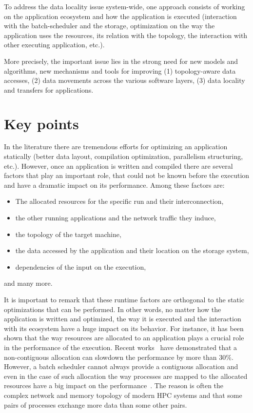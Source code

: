 To address the data locality issue system-wide, one approach consists of
working on the application ecosystem and how the application is executed
(interaction with the batch-scheduler and the storage, optimization on
the way the application uses the resources, its relation with the
topology, the interaction with other executing application, etc.). 

More precisely, the important issue lies in the strong need for new
models and algorithms, new mechanisms and tools for improving (1)
topology-aware data accesses, (2) data movements across the various
software layers, (3) data locality and transfers for applications. 


\section{Key points}
In the literature there are tremendous efforts for optimizing an application
statically (better data layout, compilation optimization, parallelism
structuring, etc.). However, once an application is written and compiled there
are several factors that play an important role, that could not be known before
the execution and have a dramatic impact on its performance. Among these
factors are:
\begin{itemize}
\item The allocated resources for the specific run and their interconnection,
\item the other running applications and the network traffic they induce,   
\item the topology of the target machine,
\item the data accessed by the application and their location on the storage
  system,
\item dependencies of the input on the execution,
\end{itemize}
and many more.

It is important to remark that these runtime factors are orthogonal to
the static optimizations that can be performed. In other words, no
matter how the application is written and optimized, the way it is
executed and the interaction with its ecosystem have a huge impact on its
behavior. For instance, it has been shown that  the way resources are
allocated to an application plays a crucial role in the performance of the
execution.  Recent works~\cite{cui2013accelerating,kramer13} have
demonstrated that a non-contiguous allocation can slowdown the
performance by more than 30\%. However, a batch scheduler cannot always
provide a contiguous allocation and even in the case of such allocation
the way processes are mapped to the allocated resources have a big
impact on the performance~\cite{DBLP:conf/ics/ChenCHRK06,jm10}. The
reason is often the complex network and memory topology of modern HPC
systems and that some pairs of processes exchange more data than some
other pairs. 

